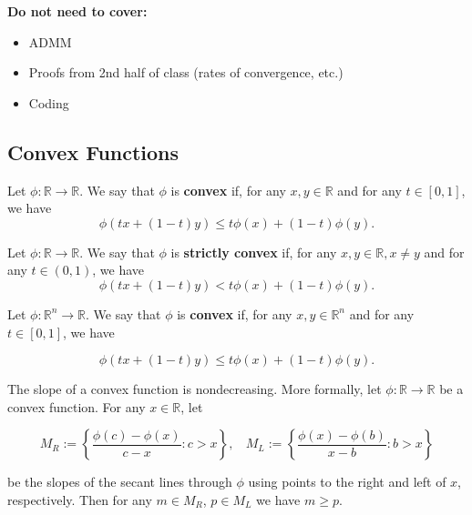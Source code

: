 \textbf{Do not need to cover:}

\begin{itemize}

\item ADMM

\item Proofs from 2nd half of class (rates of convergence, etc.)

\item Coding

\end{itemize}

\subsection{Convex Functions}\label{cvx.sec.jensen.etc}

\begin{definition}\label{cvx.defn.convex} Let $\phi:\mathbb{R}\to\mathbb{R}$.  We say that $\phi$ is \textbf{convex} if, for any $x,y\in\mathbb{R}$ and for any $t\in[0,1]$, we have
$$\phi(tx+(1-t)y)\leq t\phi(x)+(1-t)\phi(y).$$

\end{definition}

\begin{definition}\label{cvx.defn.strictly.convex} Let $\phi:\mathbb{R}\to\mathbb{R}$.  We say that $\phi$ is \textbf{strictly convex} if, for any $x,y\in\mathbb{R}, x \neq y$ and for any $t\in(0,1)$, we have
$$\phi(tx+(1-t)y)< t\phi(x)+(1-t)\phi(y).$$

\end{definition}

\begin{definition}\label{cvx.defn.convex.multivar} Let $\phi:\mathbb{R}^n\to\mathbb{R}$.  We say that $\phi$ is \textbf{convex} if, for any $x,y\in\mathbb{R}^n$ and for any $t\in[0,1]$, we have

\begin{equation}\label{cvx.541a.hw6.5a}
\phi(tx+(1-t)y)\leq t\phi(x)+(1-t)\phi(y).
\end{equation}

\end{definition}

\begin{lemma}\label{cvx.slope.nondec} The slope of a convex function is nondecreasing. More formally, let \(\phi: \mathbb{R} \to \mathbb{R}\) be a convex function. For any \(x \in \mathbb{R}\), let 

\[
M_R:= \left\{ \frac{\phi(c) - \phi(x) }{c-x}  : c > x\right\}, \ \ \ \ M_L:= \left\{ \frac{\phi(x) - \phi(b) }{x - b}  : b > x\right\}
\]

be the slopes of the secant lines through \(\phi\) using points to the right and left of \(x\), respectively. Then for any \(m \in M_R\), \(p \in M_L\) we have \(m \geq p\).

\end{lemma}

